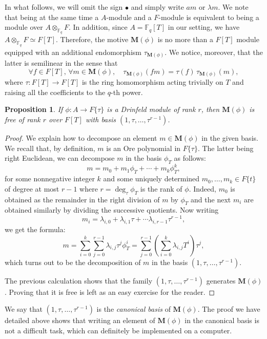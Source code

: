 \documentclass[11pt]{article}
\newtheorem{proposition}[theorem]{Proposition}
\theoremstyle{definition}
\newcommand\Fq{\mathbb{F}_q}
\newcommand{\MM}{\mathbf{M}}
\begin{document}
In what follows, we will omit the sign $\bullet$ and simply write
$am$ or $\lambda m$.
We note that being at the same time a
$A$-module and a $F$-module is equivalent to being a module over
$A \otimes_{\Fq} F$. In addition, since $A = \Fq[T]$ in our setting, we
have $A \otimes_{\Fq} F \simeq F[T]$.
Therefore, the motive $\MM(\phi)$ is no more than a $F[T]$ module
equipped with an additional endomorphism $\tau_{\MM(\phi)}$. We notice, moreover, that the latter is semilinear in the sense that
$$\forall f \in F[T], \, \forall m \in \MM(\phi), \quad
\tau_{\MM(\phi)}(fm) = \tau(f) \, \tau_{\MM(\phi)}(m),$$
where $\tau : F[T] \to F[T]$ is the ring homomorphism acting
trivially on $T$ and raising all the coefficients to the $q$-th power.
\begin{proposition}
\label{prop:basismotive}
If $\phi : A \to F\{\tau\}$ is a Drinfeld module of rank $r$,
then $\MM(\phi)$ is free of rank $r$ over $F[T]$ with basis
$(1, \tau, \ldots, \tau^{r-1})$.
\end{proposition}

\begin{proof}
We explain how to decompose an element $m \in \MM(\phi)$ in the
given basis. We recall that, by definition, $m$ is an Ore polynomial
in $F\{\tau\}$.
The latter being right Euclidean, we can decompose $m$ in the basis $\phi_T$ as follows:
$$m = m_0 + m_1 \phi_T + \cdots + m_k \phi_T^k,$$
for some nonnegative integer $k$ and some uniquely determined
$m_0, \ldots, m_k \in F\{t\}$ of degree at most $r{-}1$ where
$r = \deg_\tau \phi_T$ is the rank of $\phi$.
Indeed, $m_0$ is obtained as the remainder in the right division of
$m$ by $\phi_T$ and the next $m_i$ are obtained similarly by
dividing the successive quotients. Now writing
$$m_i =
\lambda_{i,0} + \lambda_{i,1} \tau + \cdots
\lambda_{i,r-1} \tau^{r-1},$$ we get the formula:
$$m = \sum_{i=0}^k \sum_{j=0}^{r-1} \lambda_{i,j} \tau^j \phi_T^i
    = \sum_{j=0}^{r-1} \left(\sum_{i=0}^k \lambda_{i,j} T^i\right) \tau^j,$$
which turns out to be the decomposition of $m$ in the basis
$(1, \tau, \ldots, \tau^{r-1})$.

The previous calculation shows that the family $(1, \tau, \ldots,
\tau^{r-1})$ generates $\MM(\phi)$. Proving that it is free is left
as an easy exercise for the reader.
\end{proof}

We say that $(1, \tau, \ldots, \tau^{r-1})$ is the
\emph{canonical basis} of $\MM(\phi)$. The proof we have detailed above
shows that writing an element of $\MM(\phi)$ in the canonical basis is
not a difficult task, which can definitely be implemented on a computer.
\end{document}
